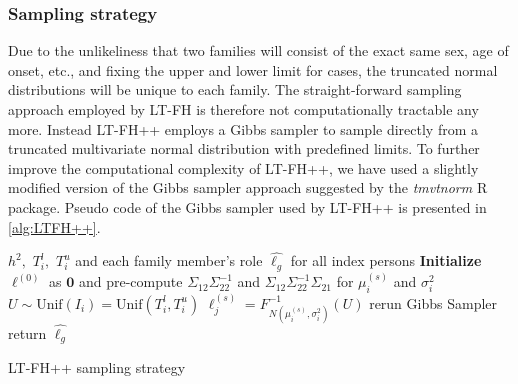 \subsubsection{Sampling strategy}

Due to the unlikeliness that two families will consist of the exact same sex, age of onset, etc., and fixing the upper and lower limit for cases, the truncated normal distributions will be unique to each family. The straight-forward sampling approach employed by LT-FH is therefore not computationally tractable any more. Instead LT-FH++ employs a Gibbs sampler to sample directly from a truncated multivariate normal distribution with predefined limits. To further improve the computational complexity of LT-FH++, we have used a slightly modified version of the Gibbs sampler approach suggested by the \textit{tmvtnorm} R package\cite{wilhelm2015gibbs,wilhelm2010tmvtnorm}. Pseudo code of the Gibbs sampler used by LT-FH++ is presented in \cref{alg:LTFH++}.


\begin{algorithm}
\begin{algorithmic}[1]
\INPUT $ h^2,$ $T_{i}^l,$ $T_{i}^u$ and each family member's role 
\OUTPUT $ \hat{\ell_g} $ for all index persons
\GIBBS
\STATE \textbf{Initialize} $\ell^{(0)}$ as $ \mathbf{0} $ and pre-compute $ \Sigma_{12} \Sigma_{22}^{-1} $ and $ \Sigma_{12} \Sigma_{22}^{-1} \Sigma_{21} $ for $ \mu_i^{(s)} $ and $ \sigma^2_i $
	  
	\STATE $ U \sim \text{Unif}(I_i) = \text{Unif}(T_i^l, T_i^u) $ 
	\STATE $ \ell_j^{(s)} = F^{-1}_{N(\mu_i^{(s)}, \sigma_i^2)}(U) $
	\ENDFOR
\ENDFOR
{}
\STATE rerun Gibbs Sampler
\ELSE
\STATE return  $ \hat{\ell_g} $
\ENDIF
\end{algorithmic}
\caption{LT-FH++ sampling strategy}
\label{alg:LTFH++}
\end{algorithm}


